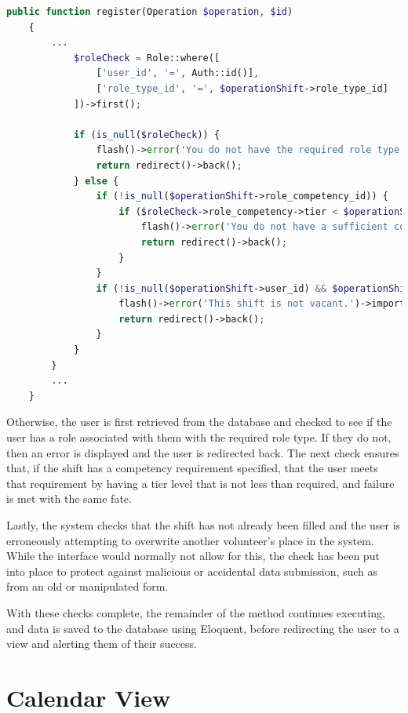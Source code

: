 \begin{lstlisting}[language=PHP, breaklines]
    public function register(Operation $operation, $id)
    {
        ...
            $roleCheck = Role::where([
                ['user_id', '=', Auth::id()],
                ['role_type_id', '=', $operationShift->role_type_id]
            ])->first();
            
            if (is_null($roleCheck)) {
                flash()->error('You do not have the required role type.')->important();
                return redirect()->back();
            } else {
                if (!is_null($operationShift->role_competency_id)) {
                    if ($roleCheck->role_competency->tier < $operationShift->role_competency->tier) {
                        flash()->error('You do not have a sufficient competency / grade tier.')->important();
                        return redirect()->back();
                    }
                }
                if (!is_null($operationShift->user_id) && $operationShift->user_id !== Auth::id()) {
                    flash()->error('This shift is not vacant.')->important();
                    return redirect()->back();
                }
            }
        }
        ...
    }
\end{lstlisting}

Otherwise, the user is first retrieved from the database and checked to see if the user has a role associated with them with the required role type. If they do not, then an error is displayed and the user is redirected back. The next check ensures that, if the shift has a competency requirement specified, that the user meets that requirement by having a tier level that is not less than required, and failure is met with the same fate.

Lastly, the system checks that the shift has not already been filled and the user is erroneously attempting to overwrite another volunteer's place in the system. While the interface would normally not allow for this, the check has been put into place to protect against malicious or accidental data submission, such as from an old or manipulated form.

With these checks complete, the remainder of the method continues executing, and data is saved to the database using Eloquent, before redirecting the user to a view and alerting them of their success.

\section{Calendar View}

